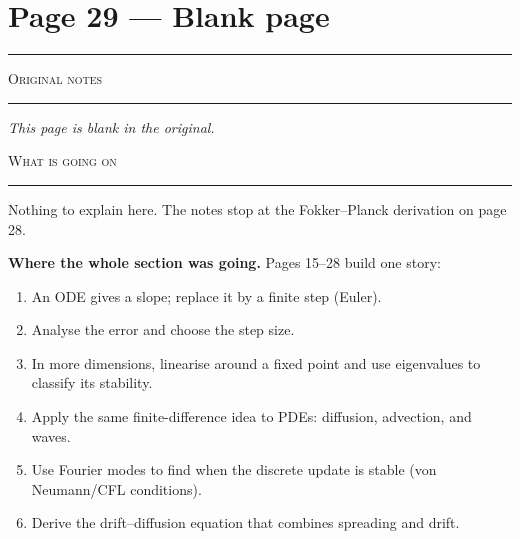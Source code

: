 \documentclass[10pt,a4paper]{article}
\newcommand{\pairpage}[3]{%
  \clearpage
  \section*{\normalsize Page #1}
  \vspace{-0.9em}
  {\color{black!35}\rule{\linewidth}{0.4pt}}\par\vspace{0.2em}
  \noindent
  \begin{minipage}[t]{0.473\textwidth}
    {\scriptsize\textsc{Original notes}}\par\vspace{0.15em}
    {\color{black!25}\rule{\linewidth}{0.3pt}}\par\vspace{0.2em}
    #2
  \end{minipage}%
  \hfill
  \begin{minipage}[t]{0.473\textwidth}
    {\scriptsize\textsc{What is going on}}\par\vspace{0.15em}
    {\color{black!25}\rule{\linewidth}{0.3pt}}\par\vspace{0.2em}
    #3
  \end{minipage}%
}
\begin{document}
\pairpage{29 --- Blank page}{%
\begin{center}
\emph{This page is blank in the original.}
\end{center}
}{%
Nothing to explain here. The notes stop at the Fokker--Planck
derivation on page 28.

\textbf{Where the whole section was going.} Pages 15--28 build one
story:
\begin{enumerate}
\item An ODE gives a slope; replace it by a finite step (Euler).
\item Analyse the error and choose the step size.
\item In more dimensions, linearise around a fixed point and use
eigenvalues to classify its stability.
\item Apply the same finite-difference idea to PDEs: diffusion,
advection, and waves.
\item Use Fourier modes to find when the discrete update is stable
(von Neumann/CFL conditions).
\item Derive the drift--diffusion equation that combines spreading and
drift.
\end{enumerate}
}
\end{document}
